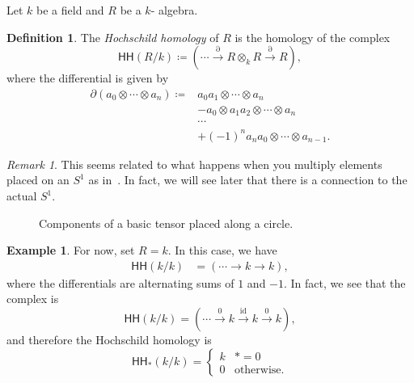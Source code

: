 \documentclass[10pt]{amsart}
\theoremstyle{definition}
\newtheorem{defn}[thm]{Definition}
\newtheorem{exm}[thm]{Example}
\theoremstyle{remark}
\newtheorem{rmk}[thm]{Remark}
\theoremstyle{plain}
\theoremstyle{definition}
\theoremstyle{remark}
\newcommand{\mr}[1]{\mathrm{#1}}
\newcommand{\ms}[1]{\mathsf{#1}}
\newcommand{\1}{\mathbf{1}}
\newcommand{\2}{\mathbf{2}}
\newcommand{\3}{\mathbf{3}}
\newcommand{\HH}{\ms{HH}}
\begin{document}
Let \(k\) be a field and \(R\) be a \(k\)- algebra.

\begin{defn}
    The \textit{Hochschild homology} of \(R\) is the homology of the complex
    \[
        \HH(R/k) \coloneqq (\cdots \xrightarrow{\partial} R \otimes_k R \xrightarrow{\partial} R),
    \]
    where the differential is given by
    \begin{align*}
        \partial(a_0 \otimes \cdots \otimes a_n) \coloneqq{} & a_0 a_1 \otimes \cdots \otimes a_n \\
        &- a_0 \otimes a_1 a_2 \otimes \cdots \otimes a_n \\
        & \cdots \\
        &+ (-1)^n a_n a_0 \otimes \cdots \otimes a_{n-1}.
    \end{align*}
\end{defn}

\begin{rmk}
    This seems related to what happens when you multiply elements placed on an \(S^1\) as in~. In fact, we will see later that there is a connection to the actual \(S^1\).
    \begin{figure}[htpb]
    \begin{center}
    \end{center}
    \caption{Components of a basic tensor placed along a circle.}%
    \label{fig:hhcircle}
    \end{figure}
\end{rmk}

\begin{exm}
    For now, set \(R=k\). In this case, we have
    \begin{align*}
        \HH(k/k) &= (\cdots \to k \to k),
    \end{align*}
    where the differentials are alternating sums of $1$ and $-1$. In fact, we see that the complex is
    \[ \HH(k/k) = (\cdots \xrightarrow{0} k \xrightarrow{\mr{id}} k \xrightarrow{0}k), \]
    and therefore the Hochschild homology is
    \[ \HH_*(k/k) = \begin{cases}
        k & *=0 \\
        0 & \text{otherwise}.
    \end{cases} \]
\end{exm}
\end{document}
